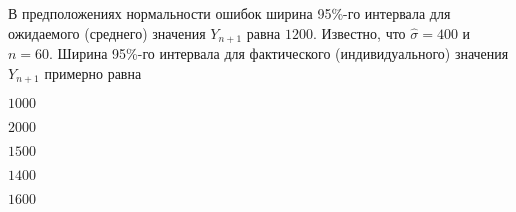 
\begin{question}
В предположениях нормальности ошибок ширина 95\%-го интервала для ожидаемого (среднего) значения \(Y_{n+1}\) равна \(1200\).
Известно, что \(\hat\sigma = 400\) и \(n=60\).
Ширина 95\%-го интервала для фактического (индивидуального) значения \(Y_{n+1}\) примерно равна
\begin{answerlist}
  \item \(1000\)
  \item \(2000\)
  \item \(1500\)
  \item \(1400\)
  \item \(1600\)
\end{answerlist}
\end{question}


